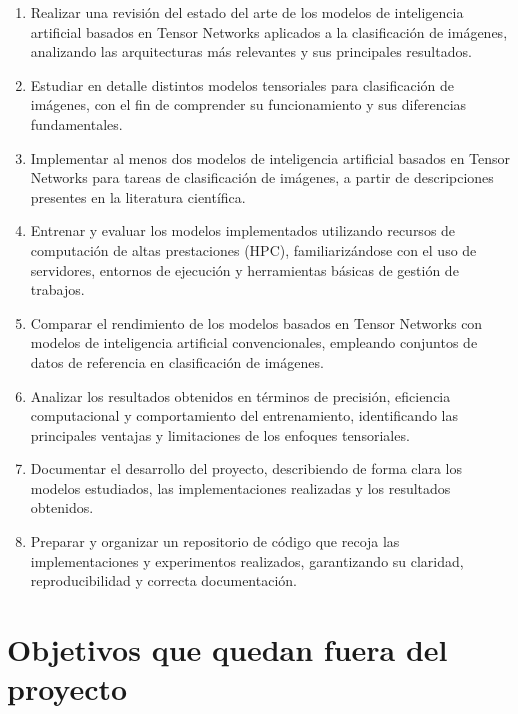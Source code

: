 \documentclass[11pt,a4paper]{report}
\begin{document}
\begin{enumerate}

	\item Realizar una revisión del estado del arte de los modelos de inteligencia artificial basados en Tensor Networks aplicados a la clasificación de imágenes, analizando las arquitecturas más relevantes y sus principales resultados.

	\item Estudiar en detalle distintos modelos tensoriales para clasificación de imágenes, con el fin de comprender su funcionamiento y sus diferencias fundamentales.

	\item Implementar al menos dos modelos de inteligencia artificial basados en Tensor Networks para tareas de clasificación de imágenes, a partir de descripciones presentes en la literatura científica.

	\item Entrenar y evaluar los modelos implementados utilizando recursos de computación de altas prestaciones (HPC), familiarizándose con el uso de servidores, entornos de ejecución y herramientas básicas de gestión de trabajos.

	\item Comparar el rendimiento de los modelos basados en Tensor Networks con modelos de inteligencia artificial convencionales, empleando conjuntos de datos de referencia en clasificación de imágenes.

	\item Analizar los resultados obtenidos en términos de precisión, eficiencia computacional y comportamiento del entrenamiento, identificando las principales ventajas y limitaciones de los enfoques tensoriales.

	\item Documentar el desarrollo del proyecto, describiendo de forma clara los modelos estudiados, las implementaciones realizadas y los resultados obtenidos.

	\item Preparar y organizar un repositorio de código que recoja las implementaciones y experimentos realizados, garantizando su claridad, reproducibilidad y correcta documentación.
	
\end{enumerate}

\section{Objetivos que quedan fuera del proyecto}
\end{document}
